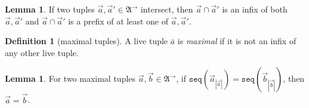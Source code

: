 \documentclass[draft]{scrartcl}
\theoremstyle{definition}
\newtheorem{definition}[theorem]{Definition}
\newtheorem{lemma}[theorem]{Lemma}
\newcommand{\struct}[1]{\mathfrak{#1}}
\newcommand{\seq}[1]{\mathtt{seq}({#1})}
\begin{document}
\pagebreak

\begin{lemma}\label{lem:fgf-intersection-continuous}
  If two tuples $\overrightarrow{a}, \overrightarrow{a}' \in \struct{A}^{\rightarrow}$ intersect, then $\overrightarrow{a} \cap \overrightarrow{a}'$ is an infix of both $\overrightarrow{a}, \overrightarrow{a}'$ and
  $\overrightarrow{a} \cap \overrightarrow{a}'$ is a prefix of at least one of $\overrightarrow{a}, \overrightarrow{a}'$.
\end{lemma}

\begin{definition}[maximal tuples]
  A live tuple $\bar{a}$ is \emph{maximal} if it is not an infix of any other live tuple.
\end{definition}

\begin{lemma}\label{lem:maximal-tuple-sequences}
  For two maximal tuples $\overrightarrow{a}, \overrightarrow{b} \in \struct{A}^{\rightarrow}$, if $\seq{\overrightarrow{a}_{|\overrightarrow{a}|}} = \seq{\overrightarrow{b}_{|\overrightarrow{b}|}}$, then $\overrightarrow{a} = \overrightarrow{b}$.
\end{lemma}
\end{document}
